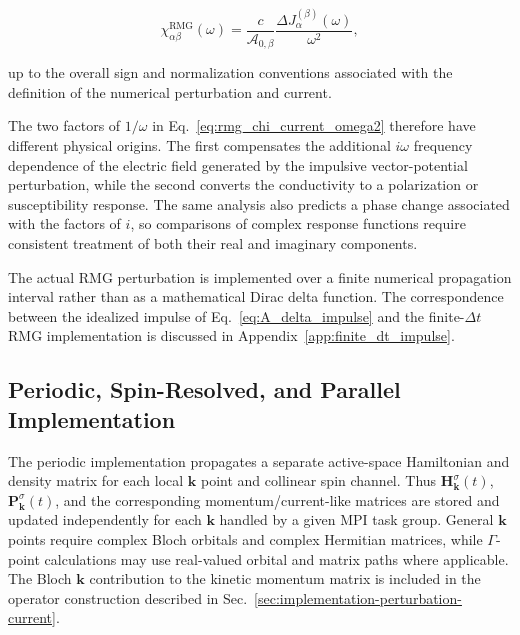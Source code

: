\begin{equation}
\chi_{\alpha\beta}^{\mathrm{RMG}}(\omega)
=
\frac{c}
     {\mathcal{A}_{0,\beta}}
\frac{\Delta J_{\alpha}^{(\beta)}(\omega)}
     {\omega^{2}},
\label{eq:rmg_chi_current_omega2}
\end{equation}

up to the overall sign and normalization conventions associated with
the definition of the numerical perturbation and current.

The two factors of $1/\omega$ in
Eq.~\eqref{eq:rmg_chi_current_omega2} therefore have different physical
origins.  The first compensates the additional $i\omega$ frequency
dependence of the electric field generated by the impulsive
vector-potential perturbation, while the second converts the
conductivity to a polarization or susceptibility response.  The same
analysis also predicts a phase change associated with the factors of
$i$, so comparisons of complex response functions require consistent
treatment of both their real and imaginary components.

The actual RMG perturbation is implemented over a finite numerical
propagation interval rather than as a mathematical Dirac delta
function.  The correspondence between the idealized impulse of
Eq.~\eqref{eq:A_delta_impulse} and the finite-$\Delta t$ RMG
implementation is discussed in Appendix~\ref{app:finite_dt_impulse}.

\subsection{Periodic, Spin-Resolved, and Parallel Implementation}
\label{sec:implementation-periodic-spin-parallel}

The periodic implementation propagates a separate active-space
Hamiltonian and density matrix for each local $\mathbf k$ point and
collinear spin channel.  Thus
$\mathbf H_{\mathbf k}^{\sigma}(t)$,
$\mathbf P_{\mathbf k}^{\sigma}(t)$, and the corresponding
momentum/current-like matrices are stored and updated independently for
each $\mathbf k$ handled by a given MPI task group.  General
$\mathbf k$ points require complex Bloch orbitals and complex
Hermitian matrices, while $\Gamma$-point calculations may use
real-valued orbital and matrix paths where applicable.  The Bloch
$\mathbf k$ contribution to the kinetic momentum matrix is included in
the operator construction described in
Sec.~\ref{sec:implementation-perturbation-current}.

